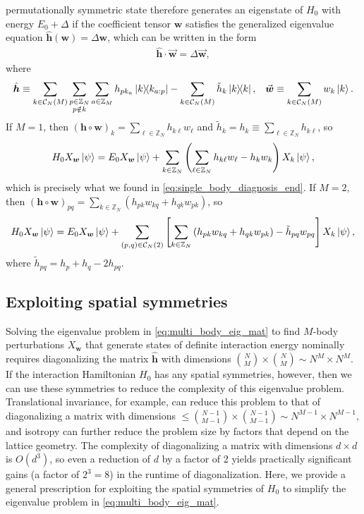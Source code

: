 \documentclass[nofootinbib,notitlepage,11pt]{revtex4-2}
\newcommand{\p}[1]{\left(#1\right)} %
\renewcommand{\sp}[1]{\left[#1\right]} %
\renewcommand{\c}{\cdot} %
\newcommand{\m}{\bm} %
\renewcommand{\v}{\vec} %
\newcommand{\1}{\mathds{1}}
\newcommand{\C}{\mathcal{C}}
\newcommand{\ZZ}{\mathbb{Z}}
\begin{document}
permutationally symmetric state therefore generates an eigenstate of
$H_0$ with energy $E_0+\Delta$ if the coefficient tensor $\m w$
satisfies the generalized eigenvalue equation
$\hat{\m h}\p{\m w} = \Delta \m w$, which can be written in the form
\begin{align}
  \hat{\m h} \c \v{\m w} = \Delta \v{\m w},
  \label{eq:multi_body_eig_mat}
\end{align}
where
\begin{align}
  \hat{\m h} \equiv \sum_{k\in\C_N\p{M}}
  \sum_{\substack{p\in\ZZ_N\\p\notin k}}
  \sum_{a\in\ZZ_M} h_{pk_a} \op{k}{k_{a:p}}
  - \sum_{k\in\C_N\p{M}} \tilde h_k \op{k},
  &&
  \v{\m w} \equiv \sum_{k\in\C_N\p{M}} w_k \ket{k}.
\end{align}
If $M=1$, then
$\p{\m h\circ\m w}_k=\sum_{\ell\in\ZZ_N} h_{k\ell} w_\ell$ and
$\tilde h_k = h_k \equiv \sum_{\ell\in\ZZ_N} h_{k\ell}$, so
\begin{align}
  H_0 X_{\m w} \ket\psi
  = E_0 X_{\m w} \ket\psi + \sum_{k\in\ZZ_N}
  \p{\sum_{\ell\in\ZZ_N} h_{k\ell} w_\ell - h_k w_k} X_k \ket\psi,
\end{align}
which is precisely what we found in
\eqref{eq:single_body_diagnosis_end}.  If $M=2$, then
$\p{\m h\circ\m w}_{pq} = \sum_{k\in\ZZ_N}
\p{h_{pk}w_{kq}+h_{qk}w_{pk}}$, so
\begin{align}
  H_0 X_{\m w} \ket\psi
  = E_0 X_{\m w} \ket\psi + \sum_{\p{p,q}\in\C_N\p{2}}
  \sp{\sum_{k\in\ZZ_N}\p{h_{pk} w_{kq} + h_{qk} w_{pk}}
    - \tilde h_{pq} w_{pq}}
  X_k \ket\psi,
\end{align}
where $\tilde h_{pq}=h_p+h_q-2h_{pq}$.

\subsection{Exploiting spatial symmetries}
\label{sec:symmetries}

Solving the eigenvalue problem in \eqref{eq:multi_body_eig_mat} to
find $M$-body perturbations $X_{\m w}$ that generate states of
definite interaction energy nominally requires diagonalizing the
matrix $\hat{\m h}$ with dimensions
${N\choose M}\times{N\choose M}\sim N^M\times N^M$.  If the
interaction Hamiltonian $H_0$ has any spatial symmetries, however,
then we can use these symmetries to reduce the complexity of this
eigenvalue problem.  Translational invariance, for example, can reduce
this problem to that of diagonalizing a matrix with dimensions
$\le{N-1\choose M-1}\times{N-1\choose M-1}\sim N^{M-1}\times N^{M-1}$,
and isotropy can further reduce the problem size by factors that
depend on the lattice geometry.  The complexity of diagonalizing a
matrix with dimensions $d\times d$ is $O\p{d^3}$, so even a reduction
of $d$ by a factor of 2 yields practically significant gains (a factor
of $2^3=8$) in the runtime of diagonalization.  Here, we provide a
general prescription for exploiting the spatial symmetries of $H_0$ to
simplify the eigenvalue problem in \eqref{eq:multi_body_eig_mat}.
\end{document}
